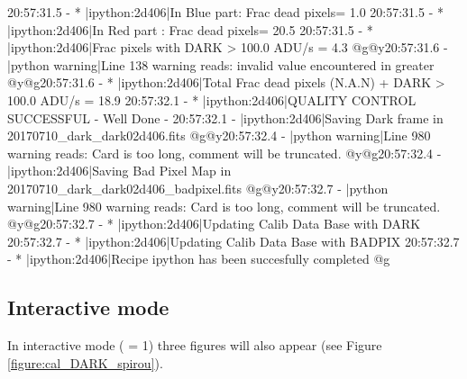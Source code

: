 \begin{cmdboxprintspecial}
20:57:31.5 - * |ipython:2d406|In Blue part: Frac dead pixels= 1.0 %
20:57:31.5 - * |ipython:2d406|In Red part : Frac dead pixels= 20.5 %
20:57:31.5 - * |ipython:2d406|Frac pixels with DARK > 100.0 ADU/s = 4.3 %
@g@y20:57:31.6 - \@ |python warning|Line 138 warning reads: invalid value encountered in greater
@y@g20:57:31.6 - * |ipython:2d406|Total Frac dead pixels (N.A.N) + DARK > 100.0 ADU/s = 18.9 %
20:57:32.1 - * |ipython:2d406|QUALITY CONTROL SUCCESSFUL - Well Done -
20:57:32.1 -   |ipython:2d406|Saving Dark frame in 20170710_dark_dark02d406.fits
@g@y20:57:32.4 - \@ |python warning|Line 980 warning reads: Card is too long, comment will be truncated.
@y@g20:57:32.4 -   |ipython:2d406|Saving Bad Pixel Map in 20170710_dark_dark02d406_badpixel.fits
@g@y20:57:32.7 - \@ |python warning|Line 980 warning reads: Card is too long, comment will be truncated.
@y@g20:57:32.7 - * |ipython:2d406|Updating Calib Data Base with DARK
20:57:32.7 - * |ipython:2d406|Updating Calib Data Base with BADPIX
20:57:32.7 - * |ipython:2d406|Recipe ipython has been succesfully completed
@g
\end{cmdboxprintspecial}


\newpage
\subsection{Interactive mode}


\noindent In interactive mode ( = 1) three figures will also appear (see Figure \ref{figure:cal_DARK_spirou}).


